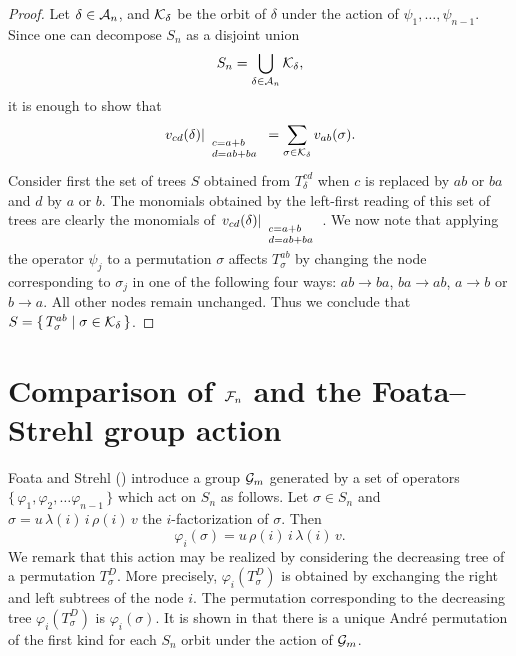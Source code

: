 \begin{proof}
Let  $\delta \in {\cal A}_n$, and ${\cal K}_{\delta}$ be the
orbit of $\delta$ under the action of $\psi_1, \ldots, \psi_{n-1}$.
Since one can decompose $S_n$ as a disjoint union
$$ S_n = \bigcup_{\delta \in {\cal A}_n}{\cal K}_{\delta},$$ 
it is enough to show that 
$$
{ \left. {v_{cd}(\delta)} \right|_{\begin{array}{l}\scriptstyle c = a+b\\[-4pt] \scriptstyle d = ab+ba\end{array}} }=
\sum_{\sigma \in {\cal K}_\delta}v_{ab}(\sigma).
$$
Consider first the set of trees $S$ obtained from $T_\delta^{cd}$
when $c$ is replaced by $ab$ or $ba$ and $d$ by  
$a$ or $b$. The monomials obtained by the left-first reading of this set
of trees are clearly the monomials of ${ \left. {v_{cd}(\delta)} \right|_{\begin{array}{l}\scriptstyle c = a+b\\[-4pt] \scriptstyle d = ab+ba\end{array}} }$. 
We now note that applying the operator $\psi_j$ to a permutation
$\sigma$ affects $T_\sigma^{ab}$ by changing the node corresponding
to  $\sigma_j$ in one of the following four ways:
$ab \rightarrow ba$, $ba \rightarrow ab$, $a \rightarrow b$ or
$b \rightarrow a$. All other nodes remain unchanged.
Thus we conclude that  $S =\{\, T_\sigma^{ab} \mid \sigma \in {\cal
K}_\delta\,\}$.\end{proof}


\section{Comparison of ${\cal F}_n$ and the Foata--Strehl group action}
\label{s_compare}

Foata and Strehl (\cite{Foata-Strehl2}) introduce a group ${\cal G}_m$
generated by a set of operators $\{\,\varphi_1, \varphi_2,\ldots\varphi_{n-1}\,\}$ which act on $S_n$ as follows.
Let $\sigma \in S_n$ and $\sigma = u\,\lambda(i)\,i\,\rho(i)\,v$ the
$i$-factorization of $\sigma$. Then 
$$
\varphi_i(\sigma) = u\,\rho(i)\,i\,\lambda(i)\,v.
$$
We remark that this action may be realized by considering the 
decreasing tree of a permutation $T_\sigma^D$.  More precisely,
$\varphi_i(T_\sigma^D)$ is obtained by exchanging the right and
left subtrees of the node $i$.  The permutation corresponding
to the decreasing tree $\varphi_i(T_\sigma^D)$ is $\varphi_i(\sigma)$.
It is shown in \cite{Foata-Strehl2} that there is a unique Andr\'e permutation
of the first kind for each $S_n$ orbit under the action of ${\cal G}_m$.

